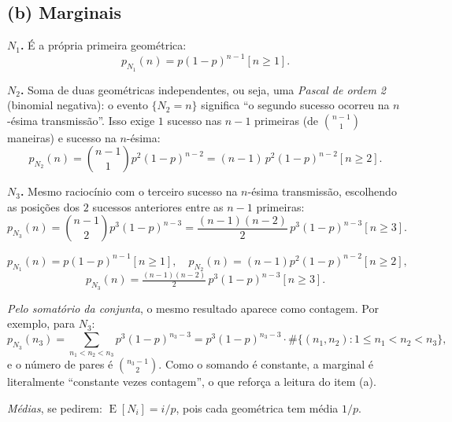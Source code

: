 \documentclass[11pt,a4paper]{article}
\newcommand{\Ind}[1]{\left[#1\right]}
\DeclareMathOperator{\E}{E}
\begin{document}
\subsection*{(b) Marginais}

\noindent\textbf{$N_1$.} É a própria primeira geométrica:
\[
p_{N_1}(n)=p(1-p)^{n-1}\Ind{n\ge1}.
\]

\noindent\textbf{$N_2$.} Soma de duas geométricas independentes, ou seja, uma
\emph{Pascal de ordem 2} (binomial negativa): o evento $\{N_2=n\}$ significa
``o segundo sucesso ocorreu na $n$-ésima transmissão''. Isso exige $1$ sucesso nas
$n-1$ primeiras (de $\binom{n-1}{1}$ maneiras) e sucesso na $n$-ésima:
\[
p_{N_2}(n)=\binom{n-1}{1}p^2(1-p)^{n-2}=(n-1)\,p^2(1-p)^{n-2}\Ind{n\ge2}.
\]

\noindent\textbf{$N_3$.} Mesmo raciocínio com o terceiro sucesso na $n$-ésima
transmissão, escolhendo as posições dos $2$ sucessos anteriores entre as $n-1$
primeiras:
\[
p_{N_3}(n)=\binom{n-1}{2}p^3(1-p)^{n-3}=\frac{(n-1)(n-2)}{2}\,p^3(1-p)^{n-3}\Ind{n\ge3}.
\]

\begin{resp}
\[
p_{N_1}(n)=p(1-p)^{n-1}\Ind{n\ge1},\quad
p_{N_2}(n)=(n-1)p^2(1-p)^{n-2}\Ind{n\ge2},
\]
\[
p_{N_3}(n)=\tfrac{(n-1)(n-2)}{2}\,p^3(1-p)^{n-3}\Ind{n\ge3}.
\]
\end{resp}

\emph{Pelo somatório da conjunta}, o mesmo resultado aparece como contagem. Por
exemplo, para $N_3$:
\[
p_{N_3}(n_3)=\sum_{n_1<n_2<n_3} p^3(1-p)^{n_3-3}
= p^3(1-p)^{n_3-3}\cdot\#\{(n_1,n_2): 1\le n_1<n_2<n_3\},
\]
e o número de pares é $\binom{n_3-1}{2}$. Como o somando é constante, a marginal é
literalmente ``constante vezes contagem'', o que reforça a leitura do item (a).

\emph{Médias}, se pedirem: $\E[N_i]=i/p$, pois cada geométrica tem média $1/p$.

\begin{center}
\end{center}
\end{document}
